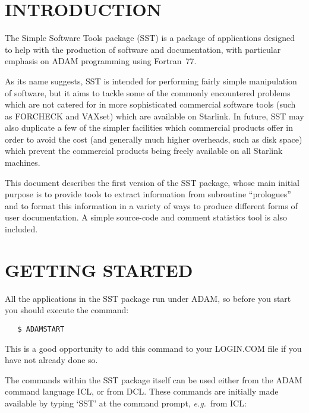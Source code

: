   \setlength{\parskip}{0mm}
  \tableofcontents
  \setlength{\parskip}{\medskipamount}
  \markright{\stardocname}

\section{INTRODUCTION}

The Simple Software Tools package (SST) is a package of applications
designed to help with the production of software and documentation, with
particular emphasis on ADAM programming using Fortran~77.

As its name suggests, SST is intended for performing fairly simple
manipulation of software, but it aims to tackle some of the
commonly encountered problems which are not catered for in more
sophisticated commercial software tools (such as FORCHECK and VAXset) which
are available on Starlink.
In future, SST may also duplicate a few of the simpler facilities which
commercial products offer in order to avoid the cost (and generally much
higher overheads, such as disk space) which prevent the commercial products
being freely available on all Starlink machines.

This document describes the first version of the SST package, whose main
initial purpose is to provide tools to extract information from subroutine
``prologues'' and to format this information in a variety of ways to produce
different forms of user documentation.
A simple source-code and comment statistics tool is also included.


\section{GETTING STARTED}

All the applications in the SST package run under ADAM, so before you start
you should execute the command:

\begin{verbatim}
   $ ADAMSTART
\end{verbatim}

This is a good opportunity to add this command to your LOGIN.COM file if you
have not already done so.

The commands within the SST package itself can be used either from the ADAM
command language ICL, or from DCL.
These commands are initially made available by typing `SST' at the command
prompt, {\em e.g.}\ from ICL:

